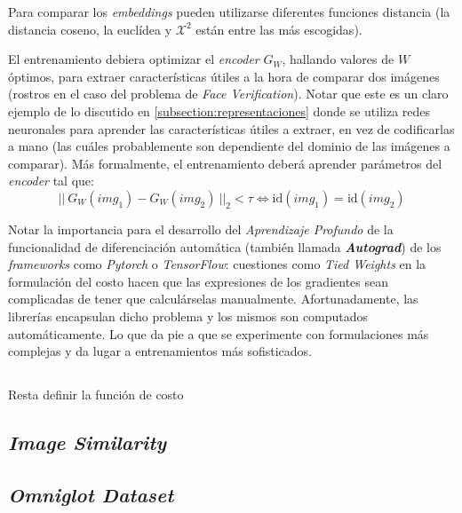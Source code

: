 Para comparar los \textit{embeddings} pueden utilizarse diferentes funciones distancia (la distancia coseno, la euclídea y $\mathcal{X}^2$ están entre las más escogidas). 

El entrenamiento debiera optimizar el \textit{encoder} $G_W$, hallando valores de $W$ óptimos, para extraer características útiles a la hora de comparar dos imágenes (rostros en el caso del problema de \textit{Face Verification}). Notar que este es un claro ejemplo de lo discutido en \ref{subsection:representaciones} donde se utiliza redes neuronales para aprender las características útiles a extraer, en vez de codificarlas a mano (las cuáles probablemente son dependiente del dominio de las imágenes a comparar).
Más formalmente, el entrenamiento deberá aprender parámetros del \textit{encoder} tal que:
\begin{equation*}
    ||~G_W(img_1) - G_W(img_2)~||_2 < \tau \Longleftrightarrow{} \text{id}(img_1) = \text{id}(img_2) 
\end{equation*}

Notar la importancia para el desarrollo del \textit{Aprendizaje Profundo} de la funcionalidad de diferenciación automática (también llamada \textbf{\textit{Autograd}}) de los \textit{frameworks} como \textit{Pytorch} o \textit{TensorFlow}: cuestiones como \textit{Tied Weights} en la formulación del costo hacen que las expresiones de los gradientes sean complicadas de tener que calculárselas manualmente. Afortunadamente, las librerías encapsulan dicho problema y los mismos son computados automáticamente. Lo que da pie a que se experimente con formulaciones más complejas y da lugar a entrenamientos más sofisticados.

\subsection{}

Resta definir la función de costo

\subsection{\textit{Image Similarity}}

\subsection{\textit{Omniglot Dataset}}

